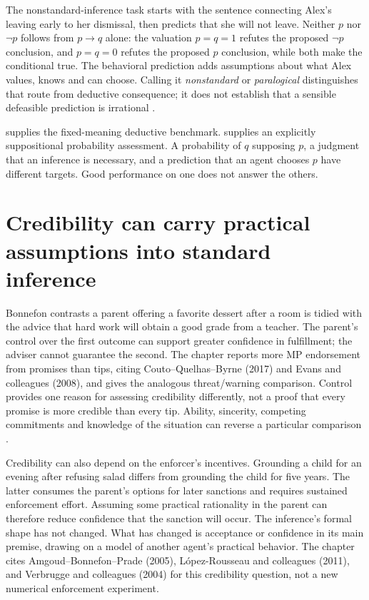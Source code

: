 The nonstandard-inference task starts with the sentence connecting Alex's
leaving early to her dismissal, then predicts that she will not leave.
Neither \(p\) nor \(\neg p\) follows from \(p\to q\) alone:
the valuation \(p=q=1\) refutes the proposed \(\neg p\) conclusion,
and \(p=q=0\) refutes the proposed \(p\) conclusion, while both make
the conditional true. The behavioral prediction adds assumptions about what
Alex values, knows and can choose. Calling it \emph{nonstandard} or
\emph{paralogical} distinguishes that route from deductive consequence;
it does not establish that a sensible defeasible prediction is irrational
\cite[p.~420]{Bonnefon2021Utility}.

 supplies the fixed-meaning deductive
benchmark.  supplies an explicitly suppositional
probability assessment. A probability of \(q\) supposing \(p\), a judgment
that an inference is necessary, and a prediction that an agent chooses
\(p\) have different targets. Good performance on one does not answer
the others.

\section{Credibility can carry practical assumptions into standard inference}
\label{sec:p19-r64-standard}

Bonnefon contrasts a parent offering a favorite dessert after a room is tidied
with the advice that hard work will obtain a good grade from a teacher.
The parent's control over the first outcome can support greater confidence
in fulfillment; the adviser cannot guarantee the second. The chapter reports
more MP endorsement from promises than tips, citing Couto--Quelhas--Byrne
(2017) and Evans and colleagues (2008), and gives the analogous threat/warning
comparison. Control provides one reason for assessing credibility differently,
not a proof that every promise is more credible than every tip. Ability,
sincerity, competing commitments and knowledge of the situation can reverse
a particular comparison \cite[pp.~420--421]{Bonnefon2021Utility}.

Credibility can also depend on the enforcer's incentives. Grounding a child
for an evening after refusing salad differs from grounding the child for five
years. The latter consumes the parent's options for later sanctions and
requires sustained enforcement effort. Assuming some practical rationality
in the parent can therefore reduce confidence that the sanction will occur.
The inference's formal shape has not changed. What has changed is acceptance
or confidence in its main premise, drawing on a model of another agent's
practical behavior. The chapter cites Amgoud--Bonnefon--Prade (2005),
L\'{o}pez-Rousseau and colleagues (2011), and Verbrugge and colleagues (2004)
for this credibility question, not a new numerical enforcement experiment.


